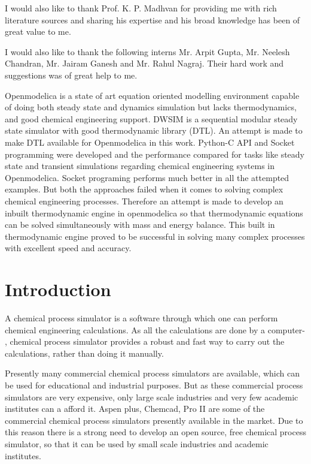 \documentclass[12pt]{report}
\begin{document}
I would also like to thank Prof. K. P. Madhvan for providing me with rich literature sources and sharing his expertise and his broad knowledge has been of great value to me.  

I would also like to thank the following interns Mr. Arpit Gupta, Mr. Neelesh Chandran, Mr. Jairam Ganesh and Mr. Rahul Nagraj. Their hard work and suggestions was of great help to me. 


\abstract
Openmodelica is a state of art equation oriented modelling environment capable of doing both steady state and dynamics simulation but lacks thermodynamics, and good chemical engineering support. DWSIM is a sequential modular steady state simulator with good thermodynamic library (DTL). An attempt is made to make DTL available for Openmodelica in this work. Python-C API and Socket programming were developed and the performance compared for tasks like steady state and transient simulations regarding chemical engineering systems in Openmodelica. Socket programing performs much better in all the attempted examples. But both the approaches failed when it comes to solving complex chemical engineering processes. Therefore an attempt is made to develop an inbuilt thermodynamic engine in openmodelica so that thermodynamic equations can be solved simultaneously with mass and energy balance. This built in thermodynamic engine proved to be successful in solving many complex processes with excellent speed and accuracy. 
\tableofcontents
\listoftables
\listoffigures

\chapter{Introduction}
A chemical process simulator is a software through which one can perform chemical engineering calculations. As all the calculations are done by a computer-  , chemical process simulator provides a robust and fast way to carry out the calculations, rather than doing it manually.

Presently many commercial chemical process simulators are available, which can be used for educational and industrial purposes. But as these commercial process simulators are very expensive, only large scale industries and very few academic institutes can a afford it. Aspen plus, Chemcad, Pro II are some of the commercial chemical process simulators presently available in the market. Due to this reason there is a strong need to develop an open source, free chemical process simulator, so that it can be used by small scale industries and academic institutes.
\end{document}
